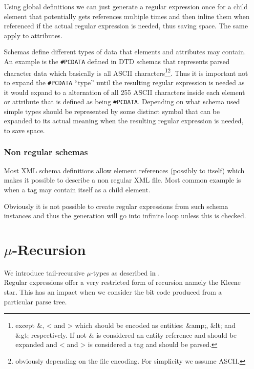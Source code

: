 \documentclass[a4paper, oneside]{memoir}
\theoremstyle{definition}
\begin{document}
Using global definitions we can just generate a regular expression once for a
child element that potentially gets references multiple times and then inline
them when referenced if the actual regular expression is needed, thus saving
space. The same apply to attributes.
\label{sec:global-definitions-save-space}

Schemas define different types of data that elements and attributes may
contain. An example is the \texttt{\#PCDATA} defined in DTD schemas that
represents parsed character data which basically is all ASCII
characters\footnote{except \&, < and > which should be encoded as entities:
  \&amp;, \&lt; and \&gt; respectively. If not \& is considered an entity
  reference and should be expanded and < and > is considered a tag and should be
  parsed.}\footnote{obviously depending on the file encoding. For simplicity we
  assume ASCII.}. Thus it is important not to expand the \texttt{\#PCDATA}
``type'' until the resulting regular expression is needed as it would expand to
a alternation of all 255 ASCII characters inside each element or attribute that
is defined as being \texttt{\#PCDATA}. Depending on what schema used simple
types should be represented by some distinct symbol that can be expanded to its
actual meaning when the resulting regular expression is needed, to save space.

\subsection{ Non regular schemas}

Most XML schema definitions allow element references (possibly to itself) which
makes it possible to describe a non regular XML file. Most common example is
when a tag may contain itself as a child element.

Obviously it is not possible to create regular expressions from such schema
instances and thus the generation will go into infinite loop unless this is
checked.

\chapter{$\mu$-Recursion}
\label{chap:mu-recursion}

We introduce tail-recursive $\mu$-types as described in \cite{heni2010}.\\[1em]

Regular expressions offer a very restricted form of recursion namely the Kleene
star. This has an impact when we consider the bit code produced from a
particular parse tree.
\end{document}
